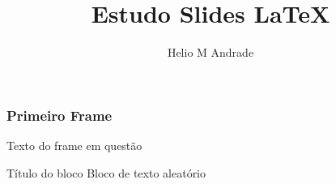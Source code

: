 \documentclass[14pt]{beamer}
\begin{document}
	\author{Helio M Andrade}
	\title{Estudo Slides LaTeX}
	
	\begin{frame}[plain] %
		\maketitle %
	\end{frame}

	\begin{frame}
		\frametitle{Primeiro Frame}
		Texto do frame em questão
		
		\begin{block}{Título do bloco}
			Bloco de texto aleatório
		\end{block}
	\end{frame}
\end{document}
